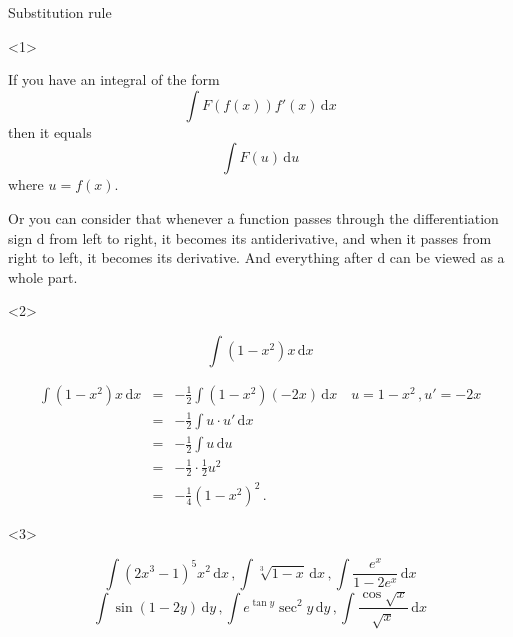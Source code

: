 \begin{frame}{Substitution rule}

\begin{onlyenv}<1>


If you have an integral of the form
\[
\int F\left(f\left(x\right)\right)f'\left(x\right)\,\mathrm{d}x
\]
then it equals
\[
\int F\left(u\right)\,\mathrm{d}u
\]
where $u=f\left(x\right)$.


Or you can consider that whenever a function passes through the differentiation
sign $\mathrm{d}$ from left to right, it becomes its antiderivative,
and when it passes from right to left, it becomes its derivative.
And everything after $\mathrm{d}$ can be viewed as a whole part.

\end{onlyenv}



\begin{onlyenv}<2>

\begin{example}
{\footnotesize{}
\[
\int\left(1-x^{2}\right)x\,\mathrm{d}x
\]
}{\footnotesize \par}
\end{example}


\pause{}
\begin{sol}
{\tiny{}
\begin{eqnarray*}
\int\left(1-x^{2}\right)x\,\mathrm{d}x & = & -\frac{1}{2}\int\left(1-x^{2}\right)\left(-2x\right)\,\mathrm{d}x\quad\boxed{u=1-x^{2}\,,u'=-2x}\\
 & = & -\frac{1}{2}\int u\cdot u'\,\mathrm{d}x\\
 & = & -\frac{1}{2}\int u\,\mathrm{d}u\\
 & = & -\frac{1}{2}\cdot\frac{1}{2}u^{2}\\
 & = & -\frac{1}{4}\left(1-x^{2}\right)^{2}\,.
\end{eqnarray*}
}{\tiny \par}
\end{sol}
\end{onlyenv}



\begin{onlyenv}<3>

\begin{example}
\[
\int\left(2x^{3}-1\right)^{5}x^{2}\,\mathrm{d}x\,,\int\sqrt[3]{1-x}\,\mathrm{d}x\,,\int\frac{e^{x}}{1-2e^{x}}\,\mathrm{d}x
\]
\[
\int\sin\left(1-2y\right)\,\mathrm{d}y\,,\int e^{\tan y}\sec^{2}y\,\mathrm{d}y\,,\int\frac{\cos\sqrt{x}}{\sqrt{x}}\,\mathrm{d}x
\]

\end{example}

\end{onlyenv}

\end{frame}

